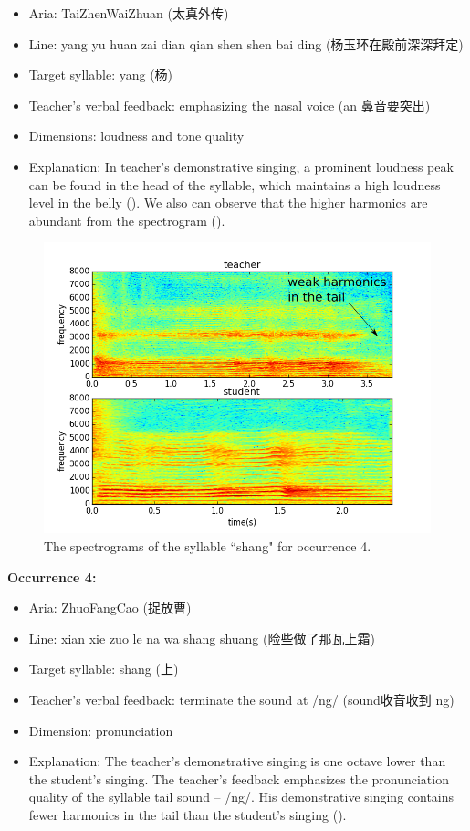 \begin{itemize}[leftmargin=*, noitemsep]
\item Aria: TaiZhenWaiZhuan (太真外传)
\item Line: yang yu huan zai dian qian shen shen bai ding (杨玉环在殿前深深拜定)
\item Target syllable: yang (杨)
\item Teacher's verbal feedback: emphasizing the nasal voice (an 鼻音要突出)
\item Dimensions: loudness and tone quality
\item Explanation: In teacher's demonstrative singing, a prominent loudness peak can be found in the head of the syllable, which maintains a high loudness level in the belly (). We also can observe that the higher harmonics are abundant from the spectrogram ().
\end{itemize}

\begin{figure}[ht!]
\includegraphics[width=\textwidth]{figs/spectro_vis/ch3_occ4.png}
\caption{The spectrograms of the syllable ``shang" for occurrence 4.}
\label{fig:occurrence_4}
\end{figure}

\noindent\textbf{Occurrence 4:}

\begin{itemize}[leftmargin=*, noitemsep]
\item Aria: ZhuoFangCao (捉放曹)
\item Line: xian xie zuo le na wa shang shuang (险些做了那瓦上霜)
\item Target syllable: shang (上)
\item Teacher's verbal feedback: terminate the sound at /ng/ (sound收音收到 ng)
\item Dimension: pronunciation
\item Explanation: The teacher's demonstrative singing is one octave lower than the student's singing. The teacher's feedback emphasizes the pronunciation quality of the syllable tail sound -- /ng/. His demonstrative singing contains fewer harmonics in the tail than the student's singing ().
\end{itemize}

